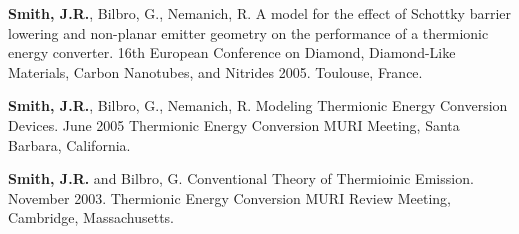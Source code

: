 \textbf{Smith, J.R.}, Bilbro, G., Nemanich, R. A model for the effect of
Schottky barrier lowering and non-planar emitter geometry on the
performance of a thermionic energy converter. 16th European Conference
on Diamond, Diamond-Like Materials, Carbon Nanotubes, and Nitrides 2005.
Toulouse, France.

\textbf{Smith, J.R.}, Bilbro, G., Nemanich, R. Modeling Thermionic
Energy Conversion Devices. June 2005 Thermionic Energy Conversion MURI
Meeting, Santa Barbara, California.

\textbf{Smith, J.R.} and Bilbro, G. Conventional Theory of Thermioinic
Emission. November 2003. Thermionic Energy Conversion MURI Review
Meeting, Cambridge, Massachusetts.
